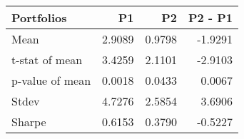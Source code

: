 \begin{tabular}{lrrr}
\toprule
Portfolios & P1 & P2 & P2 - P1 \\
\midrule
Mean & 2.9089 & 0.9798 & -1.9291 \\
t-stat of mean & 3.4259 & 2.1101 & -2.9103 \\
p-value of mean & 0.0018 & 0.0433 & 0.0067 \\
Stdev & 4.7276 & 2.5854 & 3.6906 \\
Sharpe & 0.6153 & 0.3790 & -0.5227 \\
\bottomrule
\end{tabular}
